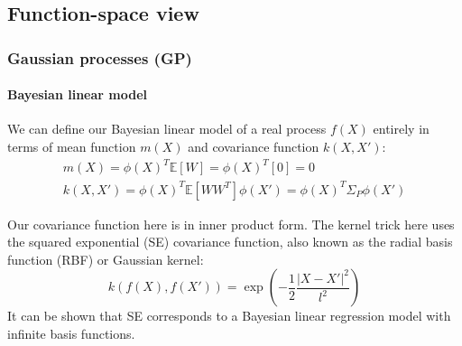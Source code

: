 \subsection{Function-space view}

\subsubsection{Gaussian processes (GP)}

\paragraph{Bayesian linear model}
We can define our Bayesian linear model of a real process $f(X)$ entirely in terms of mean function $m(X)$ and covariance function $k(X,X')$:
\begin{equation} \label{eq:gp_bayesian}
    \begin{aligned}
        m(X) = \phi(X)^T\mathbb{E}[W] = \phi(X)^T[0] = 0 \\
        k(X,X') = \phi(X)^T\mathbb{E}[WW^T]\phi(X') = \phi(X)^T\Sigma_P\phi(X')
    \end{aligned}
\end{equation}

Our covariance function here is in inner product form. The kernel trick here uses the squared exponential (SE) covariance function, also known as the radial basis function (RBF) or Gaussian kernel:
\begin{equation*}
    k(f(X), f(X')) = \exp\left(-\frac{1}{2}\frac{|X - X'|^2}{l^2}\right)
\end{equation*}
It can be shown that SE corresponds to a Bayesian linear regression model with infinite basis functions. 



